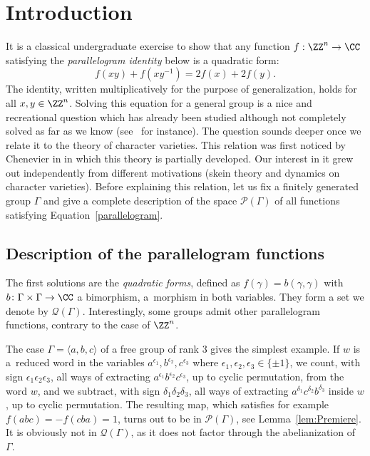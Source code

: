 \section{Introduction}

It is a classical undergraduate
exercise to show that any function
$f:\ZZ^n\to \CC$ satisfying the {\em parallelogram identity} below is a quadratic form:
\begin{equation}\label{parallelogram}
f(xy)+f(xy^{-1})=2f(x)+2f(y).
\end{equation}
The identity, written multiplicatively for the purpose of generalization,
holds for all $x,y\in \ZZ^n$.
Solving this equation for a general group is a nice and recreational question
which has already been studied although not completely solved as far as
we know (see~\cite{FriisStetkaer} for instance).
The question sounds deeper once we relate it to the theory of character
varieties. This relation was first noticed by Chenevier in \cite{Chenevier}
in which this theory is partially developed.
Our interest in it grew out independently from
different motivations (skein theory and dynamics on character varieties).
Before explaining this relation, let us fix a finitely generated
group $\Gamma$ and give a complete description of the space
$\mathcal{P}(\Gamma)$ of all functions satisfying
Equation~\eqref{parallelogram}.

\subsection{Description of the parallelogram functions}\label{ssec:IntroDesc}

The first solutions are the {\em quadratic forms}, defined as
$f(\gamma)=b(\gamma,\gamma)$ with $b\colon\Gamma\times\Gamma\to\CC$
a bimorphism, \ie a~morphism in both variables.
They form a set we denote by
$\mathcal{Q}(\Gamma)$.
Interestingly, some groups admit other parallelogram functions,
contrary to the case of $\ZZ^n$.

The case $\Gamma=\langle a,b,c\rangle$ of a free group of rank $3$ gives the
simplest example. If $w$ is a~reduced word in the variables
$a^{\epsilon_1},b^{\epsilon_2},c^{\epsilon_3}$
where $\epsilon_1,\epsilon_2,\epsilon_3\in\{\pm 1\}$,
we count, with sign
$\epsilon_1\epsilon_2\epsilon_3$, all ways of extracting
$a^{\epsilon_1} b^{\epsilon_2} c^{\epsilon_3}$, up to cyclic permutation,
from the word $w$, and we subtract, with sign $\delta_1\delta_2\delta_3$,
all ways of extracting $a^{\delta_1}c^{\delta_2}b^{\delta_3}$
inside $w$, up to cyclic permutation.
The resulting map, which satisfies for example $f(abc)=-f(cba)=1$, turns out
to be in $\mathcal{P}(\Gamma)$,
see Lemma~\ref{lem:Premiere}.
It is obviously not in $\mathcal{Q}(\Gamma)$,
as it does not factor through the abelianization of~$\Gamma$.

